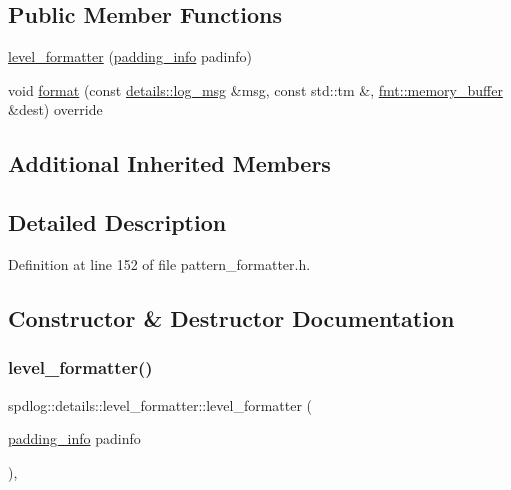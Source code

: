 \subsection*{Public Member Functions}
\begin{DoxyCompactItemize}
\item 
\hyperlink{classspdlog_1_1details_1_1level__formatter_a76ae7447054b8943fede15d0b64f8603}{level\+\_\+formatter} (\hyperlink{structspdlog_1_1details_1_1padding__info}{padding\+\_\+info} padinfo)
\item 
void \hyperlink{classspdlog_1_1details_1_1level__formatter_a36967967164ade9221ad216e0b617749}{format} (const \hyperlink{structspdlog_1_1details_1_1log__msg}{details\+::log\+\_\+msg} \&msg, const std\+::tm \&, \hyperlink{format_8h_a21cbf729f69302f578e6db21c5e9e0d2}{fmt\+::memory\+\_\+buffer} \&dest) override
\end{DoxyCompactItemize}
\subsection*{Additional Inherited Members}


\subsection{Detailed Description}


Definition at line 152 of file pattern\+\_\+formatter.\+h.



\subsection{Constructor \& Destructor Documentation}
\mbox{\label{classspdlog_1_1details_1_1level__formatter_a76ae7447054b8943fede15d0b64f8603}} 
\subsubsection{\texorpdfstring{level\+\_\+formatter()}{level\_formatter()}}
{\footnotesize\ttfamily spdlog\+::details\+::level\+\_\+formatter\+::level\+\_\+formatter (\begin{DoxyParamCaption}\item[{\hyperlink{structspdlog_1_1details_1_1padding__info}{padding\+\_\+info}}]{padinfo }\end{DoxyParamCaption})\hspace{0.3cm}{\ttfamily [inline]}, {\ttfamily [explicit]}}



